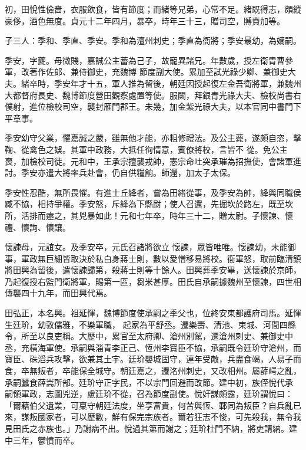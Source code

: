 \begin{pinyinscope}
 初，田悅性儉嗇，衣服飲食，皆有節度；而緒等兄弟，心常不足。緒既得志，頗縱豪侈，酒色無度。貞元十二年四月，暴卒，時年三十三，贈司空，賻賚加等。



 子三人：季和、季直、季安。季和為澶州刺史；季直為衙將；季安最幼，為嫡嗣。



 季安，字夔。母微賤，嘉誠公主蓄為己子，故寵異諸兄。年數歲，授左衛胄曹參軍，改著作佐郎、兼侍御史，充魏博
 節度副大使。累加至試光祿少卿、兼御史大夫。緒卒時，季安年才十五，軍人推為留後，朝廷因授起復左金吾衛將軍，兼魏州大都督府長史、魏博節度營田觀察處置等使。服闕，拜銀青光祿大夫、檢校尚書右僕射，進位檢校司空，襲封雁門郡王。未幾，加金紫光祿大夫，以本官同中書門下平章事。



 季安幼守父業，懼嘉誠之嚴，雖無他才能，亦粗修禮法。及公主薨，遂頗自恣，擊鞠、從禽色之娛。其軍中政務，大抵任徇情意，賓僚將校，言皆不
 從。免公主喪，加檢校司徒。元和中，王承宗擅襲戎帥，憲宗命吐突承璀為招撫使，會諸軍進討。季安亦遣大將率兵赴會，仍自供糧餉。師還，加太子太保。



 季安性忍酷，無所畏懼。有進士丘絳者，嘗為田緒從事，及季安為帥，絳與同職侯臧不協，相持爭權。季安怒，斥絳為下縣尉；使人召還，先掘坎於路左，既至坎所，活排而瘞之，其兇暴如此！元和七年卒，時年三十二，贈太尉。子懷諫、懷禮、懷詢、懷讓。



 懷諫母，元誼女。及季安卒，元氏召諸將欲立
 懷諫，眾皆唯唯。懷諫幼，未能御事，軍政無巨細皆取決於私白身蔣士則，數以愛憎移易將校。衙軍怒，取前臨清鎮將田興為留後，遣懷諫歸第，殺蔣士則等十餘人。田興葬季安畢，送懷諫於京師，乃起復授右監門衛將軍，賜第一區，芻米甚厚。田氏自承嗣據魏州至懷諫，四世相傳襲四十九年，而田興代焉。



 田弘正，本名興。祖延惲，魏博節度使承嗣之季父也，位終安東都護府司馬。延惲生廷玠，幼敦儒雅，不樂軍職，
 起家為平舒丞。遷樂壽、清池、束城、河間四縣令，所至以良吏稱。大歷中，累官至太府卿、滄州別駕，遷滄州刺史、兼御史中丞，充橫海軍使。承嗣與淄青李正己、恆州李寶臣不協，承嗣既令廷玠守滄州，而寶臣、硃滔兵攻擊，欲兼其土宇。廷玠嬰城固守，連年受敵，兵盡食竭，人易子而食，卒無叛者，卒能保全城守。朝廷嘉之，遷洺州刺史，又改相州。屬薛崿之亂，承嗣蠶食薛嵩所部。廷玠守正字民，不以宗門回避而改節。建中初，族侄悅代承
 嗣領軍政，志圖兇逆，慮廷玠不從，召為節度副使。悅奸謀頗露，廷玠謂悅曰：「爾藉伯父遺業，可稟守朝廷法度，坐享富貴，何苦與恆、鄆同為叛臣？自兵亂已來，謀叛國家者，可以歷數，鮮有保完宗族者。爾若狂志不悛，可先殺我，無令我見田氏之赤族也。」乃謝病不出。悅過其第而謝之；廷玠杜門不納，將吏請納。建中三年，鬱憤而卒。




\end{pinyinscope}
